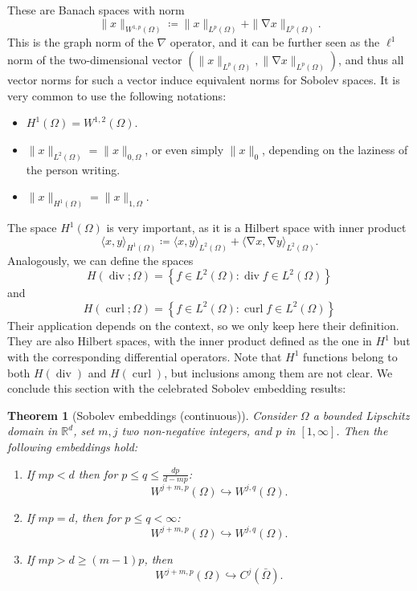 \documentclass{article}
\DeclareMathOperator{\grad}{\nabla}
\DeclareMathOperator{\dive}{\text{div}}
\DeclareMathOperator{\curl}{\text{curl}}
\newcommand{\R}{\mathbb{R}}
\newtheorem{theorem}{Theorem}
\begin{document}
These are Banach spaces with norm
    $$ \| x \|_{W^{1,p}(\Omega)} \coloneqq \| x \|_{L^p(\Omega)} + \| \grad x \|_{L^p(\Omega)}. $$
This is the graph norm of the $\nabla$ operator, and it can be further seen as the $\ell^1$ norm of the two-dimensional vector $(\|x\|_{L^p(\Omega)}, \|\grad x\|_{L^p(\Omega)})$, and thus all vector norms for such a vector induce equivalent norms for Sobolev spaces. It is very common to use the following notations:   
    \begin{itemize}
        \item $H^1(\Omega) = W^{1,2}(\Omega)$.
        \item $\| x \|_{L^2(\Omega)} = \| x \|_{0,\Omega}$, or even simply $ \| x\|_0$, depending on the laziness of the person writing. 
        \item $\| x \|_{H^1(\Omega)} = \|x\|_{1,\Omega}$.
    \end{itemize}
The space $H^1(\Omega)$ is very important, as it is a Hilbert space with inner product
    $$ \langle x,y\rangle_{H^1(\Omega)} \coloneqq \langle x,y\rangle_{L^2(\Omega)} + \langle \grad x, \grad y\rangle_{L^2(\Omega)}. $$
Analogously, we can define the spaces
    $$ H(\dive; \Omega) = \left\{f\in L^2(\Omega): \dive f \in L^2(\Omega)\right\} $$
and    
    $$ H(\curl; \Omega) = \left\{f\in L^2(\Omega): \curl f \in L^2(\Omega)\right\}$$
Their application depends on the context, so we only keep here their definition. They are also Hilbert spaces, with the inner product defined as the one in $H^1$ but with the corresponding differential operators. Note that $H^1$ functions belong to both $H(\dive)$ and $H(\curl)$, but inclusions among them are not clear. We conclude this section with the celebrated Sobolev embedding results: 

\begin{theorem}[Sobolev embeddings (continuous)]
    Consider $\Omega$ a bounded Lipschitz domain in $\R^d$, set $m,j$ two non-negative integers, and $p$ in $[1,\infty]$. Then the following embeddings hold: 
    \begin{enumerate}
        \item If $mp < d$ then for $p \leq q \leq \frac{dp}{d-mp}$:
            $$ W^{j+m, p}(\Omega) \hookrightarrow W^{j,q}(\Omega). $$
        \item If $mp = d$, then for $p \leq q < \infty$:
            $$ W^{j+m, p}(\Omega) \hookrightarrow W^{j,q}(\Omega). $$
        \item If $mp > d \geq (m-1)p$, then 
            $$ W^{j+m,p}(\Omega) \hookrightarrow C^j(\bar\Omega). $$
    \end{enumerate}
\end{theorem}
\end{document}
